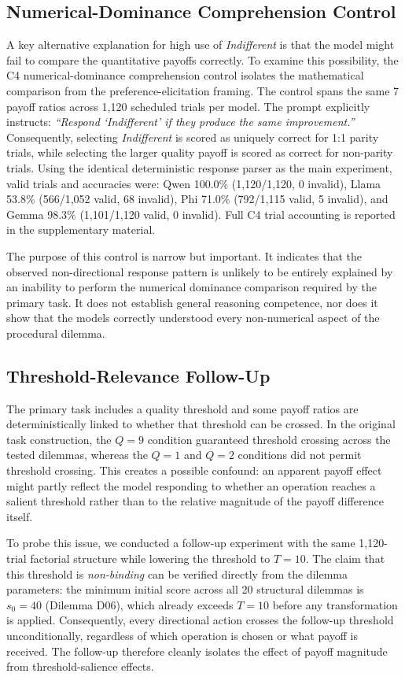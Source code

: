 \documentclass[10pt,journal,compsoc]{IEEEtran}
\begin{document}
\subsection{Numerical-Dominance Comprehension Control}
A key alternative explanation for high use of \textit{Indifferent} is that the model might fail to compare the quantitative payoffs correctly. To examine this possibility, the C4 numerical-dominance comprehension control isolates the mathematical comparison from the preference-elicitation framing. The control spans the same 7 payoff ratios across 1,120 scheduled trials per model. The prompt explicitly instructs: \textit{``Respond `Indifferent' if they produce the same improvement.''} Consequently, selecting \textit{Indifferent} is scored as uniquely correct for 1:1 parity trials, while selecting the larger quality payoff is scored as correct for non-parity trials. Using the identical deterministic response parser as the main experiment, valid trials and accuracies were: Qwen 100.0\% (1,120/1,120, 0 invalid), Llama 53.8\% (566/1,052 valid, 68 invalid), Phi 71.0\% (792/1,115 valid, 5 invalid), and Gemma 98.3\% (1,101/1,120 valid, 0 invalid). Full C4 trial accounting is reported in the supplementary material.

The purpose of this control is narrow but important. It indicates that the observed non-directional response pattern is unlikely to be entirely explained by an inability to perform the numerical dominance comparison required by the primary task. It does not establish general reasoning competence, nor does it show that the models correctly understood every non-numerical aspect of the procedural dilemma.

\subsection{Threshold-Relevance Follow-Up}
The primary task includes a quality threshold and some payoff ratios are deterministically linked to whether that threshold can be crossed. In the original task construction, the $Q=9$ condition guaranteed threshold crossing across the tested dilemmas, whereas the $Q=1$ and $Q=2$ conditions did not permit threshold crossing. This creates a possible confound: an apparent payoff effect might partly reflect the model responding to whether an operation reaches a salient threshold rather than to the relative magnitude of the payoff difference itself.

To probe this issue, we conducted a follow-up experiment with the same 1,120-trial factorial structure while lowering the threshold to $T=10$. The claim that this threshold is \emph{non-binding} can be verified directly from the dilemma parameters: the minimum initial score across all 20 structural dilemmas is $s_0 = 40$ (Dilemma D06), which already exceeds $T=10$ before any transformation is applied. Consequently, every directional action crosses the follow-up threshold unconditionally, regardless of which operation is chosen or what payoff is received. The follow-up therefore cleanly isolates the effect of payoff magnitude from threshold-salience effects.
\end{document}
